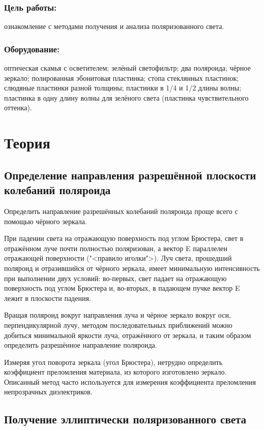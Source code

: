 \documentclass[a4paper,12pt]{article}
\begin{document}
\subsubsection*{Цель работы:} ознакомление с методами получения и анализа поляризованного света.

\subsubsection*{Оборудование:} оптическая скамья с осветителем; зелёный светофильтр; два поляроида; чёрное зеркало; полированная эбонитовая пластинка; стопа стеклянных пластинок; слюдяные пластинки разной толщины; пластинки в 1/4 и 1/2 длины волны; пластинка в одну длину волны для зелёного света (пластинка чувствительного оттенка).

\section*{Теория}

\subsection*{Определение направления разрешённой плоскости колебаний поляроида}

Определить направление разрешённых колебаний поляроида проще всего с помощью чёрного зеркала.

При падении света на отражающую поверхность под углом Брюстера, свет в отражённом луче почти полностью поляризован, а вектор E
параллелен отражающей поверхности ("<правило иголки">). Луч света,
прошедший поляроид и отразившийся от чёрного зеркала, имеет минимальную интенсивность при выполнении двух условий: во-первых, свет
падает на отражающую поверхность под углом Брюстера и, во-вторых,
в падающем пучке вектор E лежит в плоскости падения.

Вращая поляроид вокруг направления луча и чёрное зеркало вокруг
оси, перпендикулярной лучу, методом последовательных приближений
можно добиться минимальной яркости луча, отражённого от зеркала,
и таким образом определить разрешённое направление поляроида.

Измеряя угол поворота зеркала (угол Брюстера), нетрудно определить коэффициент преломления материала, из которого изготовлено
зеркало. Описанный метод часто используется для измерения коэффициента преломления непрозрачных диэлектриков.

\subsection*{Получение эллиптически поляризованного света}
\end{document}
